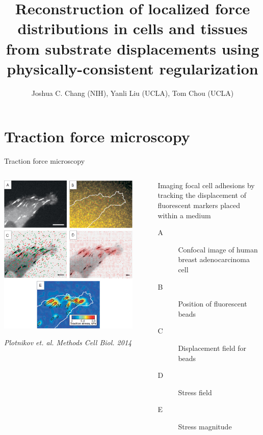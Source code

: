 \documentclass[presentation,aspectratio=169]{beamer}
\title[APS TFM talk] %
{Reconstruction of localized force distributions in cells and tissues from substrate displacements using physically-consistent regularization}
\author[Joshua C. Chang] {Joshua C. Chang (NIH), Yanli Liu (UCLA), Tom Chou (UCLA)}
\institute[NIH] %
{
}
\date[March 16, 2017] %
{
APS March Meeting 2017 \\
Session S5: Machine Learning for Modeling and Control of Biological Systems I

}
\begin{document}
\section{Traction force microscopy}

\begin{frame}
  \titlepage
\end{frame}


\begin{frame}{Traction force microscopy}
\begin{columns}
\begin{column}{0.45\textwidth}
\includegraphics[width=0.9\textwidth]{figures/nihms748056f4.jpg}

\emph{Plotnikov et. al. Methods Cell Biol. 2014}
\end{column}
\begin{column}{0.55\textwidth}

Imaging focal cell adhesions by tracking the displacement of fluorescent markers placed within a medium

\bigskip

\begin{description}
\item[A] Confocal image of human breast adenocarcinoma cell
\item[B] Position of fluorescent beads
\item[C] Displacement field for beads
\item[D] Stress field
\item[E] Stress magnitude
\end{description}


\end{column}
\end{columns}
\end{frame}
\end{document}
